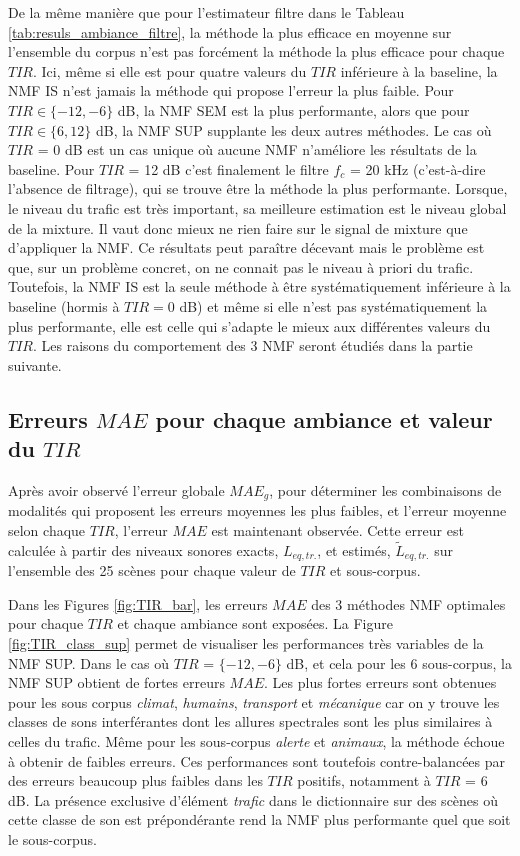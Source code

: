 De la même manière que pour l'estimateur filtre dans le Tableau \ref{tab:resuls_ambiance_filtre}, la méthode la plus efficace en moyenne sur l'ensemble du corpus n'est pas forcément la méthode la plus efficace pour chaque $TIR$. Ici, même si elle est pour quatre valeurs du $TIR$ inférieure à la baseline, la NMF IS n'est jamais la méthode qui propose l'erreur la plus faible. Pour $TIR \in \lbrace -12, -6 \rbrace$ dB, la NMF SEM est la plus performante, alors que pour $TIR\in \lbrace 6, 12 \rbrace$ dB, la NMF SUP supplante les deux autres méthodes.
Le cas où $TIR$ = 0 dB est un cas unique où aucune NMF n'améliore les résultats de la baseline. Pour $TIR$ = 12 dB c'est finalement le filtre $f_c$ = 20 kHz (c'est-à-dire l'absence de filtrage), qui se trouve être la méthode la plus performante. Lorsque, le niveau du trafic est très important, sa meilleure estimation est le niveau global de la mixture. Il vaut donc mieux ne rien faire sur le signal de mixture que d'appliquer la NMF. Ce résultats peut paraître décevant mais le problème est que, sur un problème concret, on ne connait pas le niveau à priori du trafic. 
Toutefois, la NMF IS est la seule méthode à être systématiquement inférieure à la baseline (hormis à $TIR = 0$ dB) et même si elle n'est pas systématiquement la plus performante, elle est celle qui s'adapte le mieux aux différentes valeurs du $TIR$. Les raisons du comportement des 3 NMF seront étudiés dans la partie suivante. \\


\subsection{Erreurs $MAE$ pour chaque ambiance et valeur du $TIR$}\label{part:erreurMAE}
Après avoir observé l'erreur globale $MAE_g$, pour déterminer les combinaisons de modalités qui proposent les erreurs moyennes les plus faibles, et l'erreur moyenne selon chaque $TIR$, l'erreur $MAE$ est maintenant observée. Cette erreur est calculée à partir des niveaux sonores exacts, $L_{eq,tr.}$, et estimés, $\tilde{L}_{eq,tr.}$ sur l'ensemble des 25 scènes pour chaque valeur de $TIR$ et sous-corpus.

Dans les Figures \ref{fig:TIR_bar}, les erreurs $MAE$ des 3 méthodes NMF optimales pour chaque $TIR$ et chaque ambiance sont exposées. La Figure \ref{fig:TIR_class_sup} permet de visualiser les performances très variables de la NMF SUP. Dans le cas où $TIR$ = $\lbrace -12, -6 \rbrace$ dB, et cela pour les 6 sous-corpus, la NMF SUP obtient de fortes erreurs $MAE$. Les plus fortes erreurs sont obtenues pour les sous corpus \textit{climat}, \textit{humains}, \textit{transport} et \textit{mécanique} car on y trouve les classes de sons interférantes dont les allures spectrales sont les plus similaires à celles du trafic.
Même pour les sous-corpus \textit{alerte} et \textit{animaux}, la méthode échoue à obtenir de faibles erreurs. Ces performances sont toutefois contre-balancées par des erreurs beaucoup plus faibles dans les $TIR$ positifs, notamment à $TIR$ = 6 dB. La présence exclusive d'élément \textit{trafic} dans le dictionnaire sur des scènes où cette classe de son est prépondérante rend la NMF plus performante quel que soit le sous-corpus.

